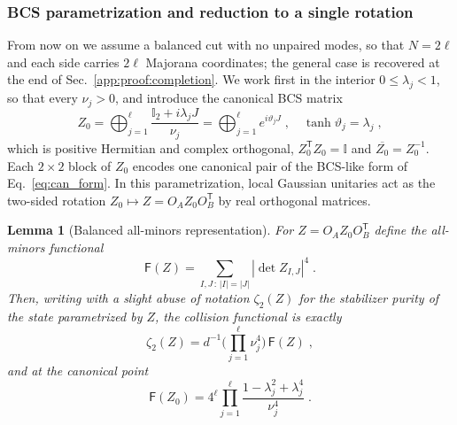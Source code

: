 \documentclass[prx,twocolumn,superscriptaddress,aps,10pt, frontmatterverbose, reprint,footinbib,longbibliography=true]{revtex4-2}
\newtheorem{lemma}{Lemma}
\newcommand{\trans}{\mathsf{T}}
\begin{document}
\subsubsection{ BCS parametrization and reduction to a single rotation}
\label{app:proof:thouless}

From now on we assume a balanced cut with no unpaired modes, so that $N=2\ell$ and each side carries $2\ell$ Majorana coordinates; the general case is recovered at the end of Sec.~\ref{app:proof:completion}.
We work first in the interior $0\le\lambda_j<1$, so that every $\nu_j>0$,
and introduce the canonical BCS matrix~\cite{Mbeng2024}
\begin{equation}
Z_0=\bigoplus_{j=1}^{\ell}\frac{\mathbb{I}_2+i\lambda_jJ}{\nu_j}=\bigoplus_{j=1}^{\ell}e^{i\vartheta_jJ}\;,\quad \tanh \vartheta_j=\lambda_j\;,
    \label{eq:Z0}
\end{equation} 
which is positive Hermitian and complex orthogonal, $Z_0^{\trans}Z_0=\mathbb{I}$ and $\overline{Z_0}=Z_0^{-1}$. Each $2\times2$ block of $Z_0$ encodes one canonical pair of the BCS-like form of Eq.~\eqref{eq:can_form}. In this parametrization, local Gaussian unitaries act as the two-sided rotation $Z_0\mapsto Z=O_AZ_0O_B^{\trans}$ by real orthogonal matrices.

\begin{lemma}[Balanced all-minors representation]
\label{lem:all-minors}
For $Z=O_AZ_0O_B^{\trans}$ define the all-minors functional
\begin{equation}
    \mathsf{F}(Z)=\sum_{I,J\,:\,|I|=|J|}\left|\det Z_{I,J}\right|^4\;.
    \label{eq:F-definition}
\end{equation}
Then, writing with a slight abuse of notation $\zeta_2(Z)$ for the stabilizer purity of the state parametrized by $Z$, the collision functional is exactly
\begin{equation}\zeta_2(Z)=d^{-1}\Big(\prod_{j=1}^{\ell}\nu_j^4\Big)\,\mathsf{F}(Z)\;,
    \label{eq:physical-F}
\end{equation}
and at the canonical point
\begin{equation}
    \mathsf{F}(Z_0)=4^{\ell}\prod_{j=1}^{\ell}\frac{1-\lambda_j^2+\lambda_j^4}{\nu_j^4}\;.
    \label{eq:F-canonical}
\end{equation}
\end{lemma}
\end{document}
